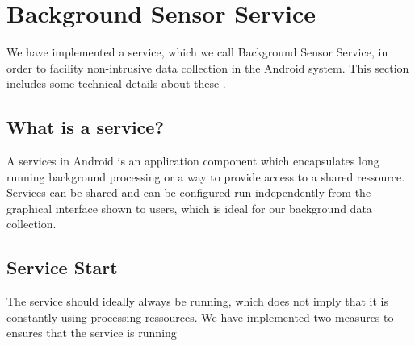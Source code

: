 
\section{Background Sensor Service}
\label{sec:background_sensor_service}

We have implemented a service, which we call Background Sensor Service, in order to facility non-intrusive data collection in the Android system. 
This section includes some technical details about these  . 

\subsection{What is a service?}

A services in Android is an application component which encapsulates long running background processing or a way to provide access to a shared ressource. Services can be shared and can be configured run independently from the graphical interface shown to users, which is ideal for our background data collection.

\subsection{Service Start}

The service should ideally always be running, which does not imply that it is constantly using processing ressources. We have implemented two measures to ensures that the service is running




